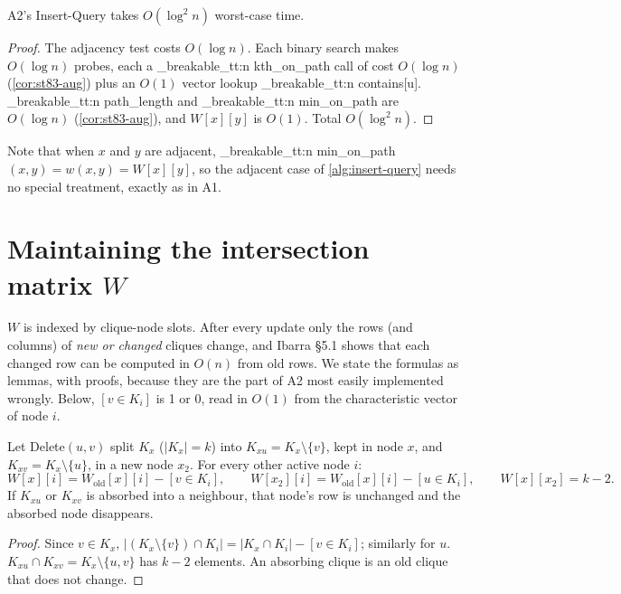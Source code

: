 \documentclass[11pt,a4paper,oneside]{report}
\theoremstyle{plain}
\theoremstyle{definition}
\theoremstyle{remark}
\newcommand{\op}[1]{\textsf{#1}}
\DeclareRobustCommand{\code}[1]{\mtp_breakable_tt:n {#1}}
\begin{document}
\begin{proposition}\label{prop:a2-iq}
A2's \op{Insert-Query} takes \(O(\log^2 n)\) worst-case time.
\end{proposition}
\begin{proof}
The adjacency test costs \(O(\log n)\). Each binary search makes \(O(\log n)\) probes, each a
\code{kth_on_path} call of cost \(O(\log n)\) (\cref{cor:st83-aug}) plus an \(O(1)\) vector lookup
\code{contains[u]}. \code{path_length} and \code{min_on_path} are \(O(\log n)\) (\cref{cor:st83-aug}), and
\(W[x][y]\) is \(O(1)\). Total \(O(\log^2 n)\).
\end{proof}

Note that when \(x\) and \(y\) are adjacent, \code{min_on_path}\((x,y)=w(x,y)=W[x][y]\), so the
adjacent case of \cref{alg:insert-query} needs no special treatment, exactly as in A1.

\section{Maintaining the intersection matrix \texorpdfstring{\(W\)}{W}}\label{sec:w-updates}
\(W\) is indexed by clique-node slots. After every update only the rows (and columns) of
\emph{new or changed} cliques change, and Ibarra \S5.1 shows that each changed row can be
computed in \(O(n)\) from old rows. We state the formulas as lemmas, with proofs, because they
are the part of A2 most easily implemented wrongly. Below, \([v\in K_i]\) is 1 or 0, read in
\(O(1)\) from the characteristic vector of node \(i\).

\begin{lemma}[\(W\) after \op{Delete}; Ibarra \S5.1]\label{lem:w-delete}
Let \op{Delete}\((u,v)\) split \(K_x\) (\(|K_x|=k\)) into \(K_{xu}=K_x\setminus\{v\}\), kept in
node \(x\), and \(K_{xv}=K_x\setminus\{u\}\), in a new node \(x_2\). For every other active node
\(i\):
\[ W[x][i]=W_{\mathrm{old}}[x][i]-[v\in K_i],\qquad W[x_2][i]=W_{\mathrm{old}}[x][i]-[u\in K_i],
\qquad W[x][x_2]=k-2. \]
If \(K_{xu}\) or \(K_{xv}\) is absorbed into a neighbour, that node's row is unchanged and the
absorbed node disappears.
\end{lemma}
\begin{proof}
Since \(v\in K_x\), \(|(K_x\setminus\{v\})\cap K_i|=|K_x\cap K_i|-[v\in K_i]\); similarly for
\(u\). \(K_{xu}\cap K_{xv}=K_x\setminus\{u,v\}\) has \(k-2\) elements. An absorbing clique is an
old clique that does not change.
\end{proof}
\end{document}

